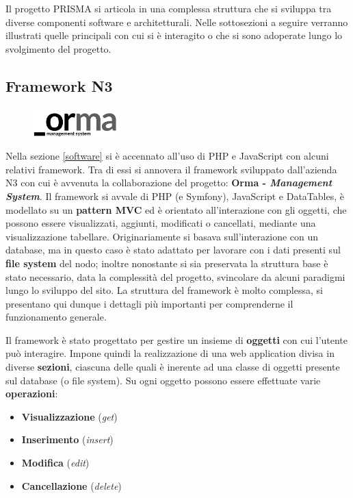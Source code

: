 Il progetto PRISMA si articola in una complessa struttura che si sviluppa tra diverse componenti software e architetturali. Nelle sottosezioni a seguire verranno illustrati quelle principali con cui si è interagito o che si sono adoperate lungo lo svolgimento del progetto.

\subsection{Framework N3} \label{framework-N3}

\begin{figure}
    \vspace{-34pt}
    \begin{center}
    \includegraphics[width=0.3\textwidth]{images/logo_orma.png}
    \end{center}
    \vspace{-30pt}
\end{figure}
Nella sezione \ref{software} si è accennato all'uso di PHP e JavaScript con alcuni relativi framework. Tra di essi si annovera il framework sviluppato dall'azienda N3 con cui è avvenuta la collaborazione del progetto: \textbf{Orma - \emph{Management System}}.
Il framework si avvale di PHP (e Symfony), JavaScript e DataTables, è modellato su un \textbf{pattern MVC} ed è orientato all'interazione con gli oggetti, che possono essere visualizzati, aggiunti, modificati o cancellati, mediante una visualizzazione tabellare. 
Originariamente si basava sull'interazione con un database, ma in questo caso è stato adattato per lavorare con i dati presenti sul \textbf{file system} del nodo; inoltre nonostante si sia preservata la struttura base è stato necessario, data la complessità del progetto, svincolare da alcuni paradigmi lungo lo sviluppo del sito. La struttura del framework è molto complessa, si presentano qui dunque i dettagli più importanti per comprenderne il funzionamento generale.

Il framework è stato progettato per gestire un insieme di \textbf{oggetti} con cui l'utente può interagire.
Impone quindi la realizzazione di una web application divisa in diverse \textbf{sezioni}, ciascuna delle quali è inerente ad una classe di oggetti presente sul database (o file system). Su ogni oggetto possono essere effettuate varie \textbf{operazioni}:
\begin{itemize}[noitemsep,nolistsep]
    \item \textbf{Visualizzazione} (\emph{get})
    \item \textbf{Inserimento} (\emph{insert})
    \item \textbf{Modifica} (\emph{edit})
    \item \textbf{Cancellazione} (\emph{delete})
\end{itemize}

